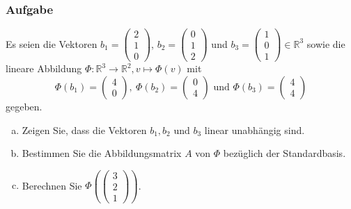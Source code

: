 \documentclass[a4paper,11pt]{scrartcl}
\newcounter{auf}
\newcommand{\Aufgabe}%
        {\addtocounter{auf}{1} \subsubsection*{\rmfamily  Aufgabe \theauf \hspace{1em}} }
\newcommand{\RR}{\mathbb{R}}
\begin{document}
\newpage
\Aufgabe

Es seien die Vektoren $b_1=\begin{pmatrix} 2\\1\\0\end{pmatrix}$, $b_2=\begin{pmatrix} 0\\1\\2\end{pmatrix}$ und $b_3=\begin{pmatrix} 1\\0\\1\end{pmatrix} \in \RR^3$ sowie die lineare Abbildung 
$
\Phi: \RR^3 \to \RR^2, v \mapsto \Phi(v)
$
mit 
$$
\Phi(b_1)=\begin{pmatrix} 4\\0\end{pmatrix}, \ \Phi(b_2)=\begin{pmatrix} 0\\4\end{pmatrix} \text{ und } \Phi(b_3)=\begin{pmatrix} 4\\4\end{pmatrix}
$$
gegeben.

\begin{enumerate}[a)]

\item Zeigen Sie, dass die Vektoren $b_1,b_2$ und $b_3$ linear unabhängig sind.
\item Bestimmen Sie die Abbildungsmatrix $A$ von $\Phi$ bezüglich der Standardbasis.
\item Berechnen Sie $\Phi(\begin{pmatrix} 3\\2\\1 \end{pmatrix})$.

\end{enumerate}
\end{document}
